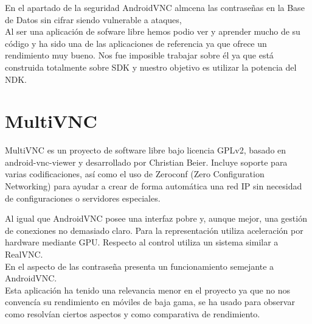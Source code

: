 En el apartado de la seguridad AndroidVNC almcena las contraseñas en la Base de Datos sin cifrar siendo vulnerable a ataques,\\

Al ser una aplicación de sofware libre hemos podio ver y aprender mucho de su código y ha sido una de las aplicaciones de referencia ya que ofrece un rendimiento muy bueno. Nos fue imposible trabajar sobre él ya que está construida totalmente sobre SDK y nuestro objetivo es utilizar la potencia del NDK.

\section{MultiVNC}
MultiVNC\cite{multivnc:multivnc} es un proyecto de software libre bajo licencia GPLv2,  basado en android-vnc-viewer y desarrollado por Christian Beier. Incluye soporte para varias codificaciones, así como el uso de Zeroconf (Zero Configuration Networking) para ayudar a crear de forma automática una red IP sin necesidad de configuraciones o servidores especiales.

Al igual que AndroidVNC posee una interfaz pobre y, aunque mejor, una gestión de conexiones no demasiado claro. Para la representación utiliza aceleración por hardware mediante GPU. Respecto al control utiliza un sistema similar a RealVNC.\\

En el aspecto de las contraseña presenta un funcionamiento semejante a AndroidVNC.\\

Esta aplicación ha tenido una relevancia menor en el proyecto ya que no nos convencía su rendimiento en móviles de baja gama, se ha usado para observar como resolvían ciertos aspectos y como comparativa de rendimiento.
